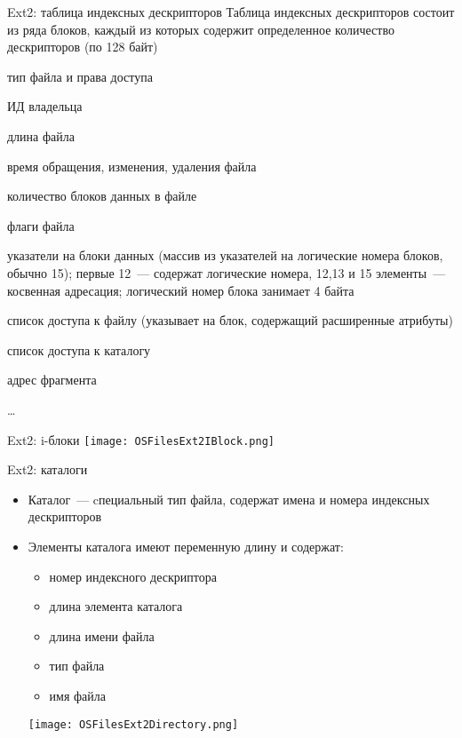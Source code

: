 \documentclass[aspectratio=169,14pt]{beamer}
\begin{document}
\begin{frame}{Ext2: таблица индексных дескрипторов}
    Таблица индексных дескрипторов состоит из ряда блоков, каждый из которых
    содержит определенное количество дескрипторов (по 128 байт)
    \begin{footnotesize}
        \begin{itemize}
            \begin{spacing}{0.8}
            \item тип файла и права доступа
            \item ИД владельца
            \item длина файла
            \item время обращения, изменения, удаления файла
            \item количество блоков данных в файле
            \item флаги файла
            \item указатели на блоки данных (массив  из указателей на
            логические номера блоков, обычно 15); первые 12~--- содержат
            логические номера, 12,13 и 15 элементы~--- косвенная адресация;
            логический номер блока занимает 4 байта
            \item список доступа к файлу (указывает на блок, содержащий
            расширенные атрибуты)
            \item список доступа к каталогу
            \item адрес фрагмента
            \item \ldots
            \end{spacing}
    \end{itemize}
    \end{footnotesize}
\end{frame}

\begin{frame}{Ext2: i-блоки}
    \texttt{[image: OSFilesExt2IBlock.png]}
\end{frame}

\begin{frame}{Ext2: каталоги}
    \begin{itemize}
        \item Каталог~--- cпециальный тип файла, содержат имена и номера
        индексных дескрипторов
        \item Элементы каталога имеют переменную длину и содержат:
        \begin{itemize}
            \item номер индексного дескриптора
            \item длина элемента каталога
            \item длина имени файла
            \item тип файла
            \item имя файла
        \end{itemize}
        \texttt{[image: OSFilesExt2Directory.png]}
    \end{itemize}
\end{frame}
\end{document}
